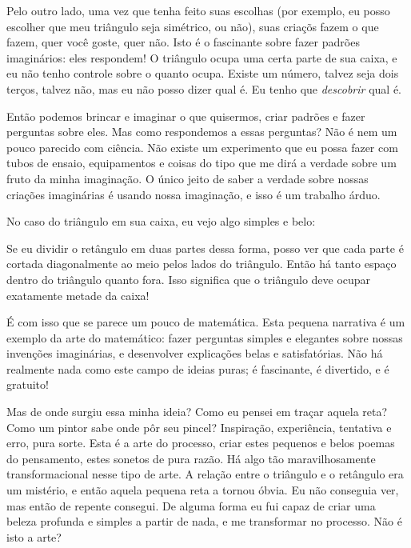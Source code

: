 \documentclass[a4paper,oneside,12pt,notitlepage]{article}
\begin{document}
Pelo outro lado, uma vez que tenha feito suas escolhas (por exemplo, eu posso escolher que meu triângulo seja simétrico, ou não), suas criaçõs fazem o que fazem, quer você goste, quer não.
Isto é o fascinante sobre fazer padrões imaginários: eles respondem!
O triângulo ocupa uma certa parte de sua caixa, e eu não tenho controle sobre o quanto ocupa.
Existe um número, talvez seja dois terços, talvez não, mas eu não posso dizer qual é.
Eu tenho que \textsl{descobrir} qual é.

Então podemos brincar e imaginar o que quisermos, criar padrões e fazer perguntas sobre eles.
Mas como respondemos a essas perguntas?
Não é nem um pouco parecido com ciência.
Não existe um experimento que eu possa fazer com tubos de ensaio, equipamentos e coisas do tipo que me dirá a verdade sobre um fruto da minha imaginação.
O único jeito de saber a verdade sobre nossas criações imaginárias é usando nossa imaginação, e isso é um trabalho árduo.

No caso do triângulo em sua caixa, eu vejo algo simples e belo:


Se eu dividir o retângulo em duas partes dessa forma, posso ver que cada parte é cortada diagonalmente ao meio pelos lados do triângulo.
Então há tanto espaço dentro do triângulo quanto fora.
Isso significa que o triângulo deve ocupar exatamente metade da caixa!

É com isso que se parece um pouco de matemática. %
Esta pequena narrativa é um exemplo da arte do matemático: fazer perguntas simples e elegantes sobre nossas invenções imaginárias, e desenvolver explicações belas e satisfatórias.
Não há realmente nada como este campo de ideias puras; é fascinante, é divertido, e é gratuito! %

Mas de onde surgiu essa minha ideia?
Como eu pensei em traçar aquela reta?
Como um pintor sabe onde pôr seu pincel?
Inspiração, experiência, tentativa e erro, pura sorte.
Esta é a arte do processo, criar estes pequenos e belos poemas do pensamento, estes sonetos de pura razão. %
Há algo tão maravilhosamente transformacional nesse tipo de arte.
A relação entre o triângulo e o retângulo era um mistério, e então aquela pequena reta a tornou óbvia.
Eu não conseguia ver, mas então de repente consegui.
De alguma forma eu fui capaz de criar uma beleza profunda e simples a partir de nada, e me transformar no processo.
Não é isto a arte? %
\end{document}
